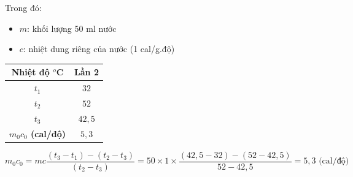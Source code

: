 \documentclass[12pt,a4paper]{report}
\begin{document}
Trong đó:
\begin{itemize}
    \item \( m \): khối lượng 50 ml nước
    \item \( c \): nhiệt dung riêng của nước (1 cal/g.độ)
\end{itemize}   
\begin{table}[h!]
    \centering
    \begin{tabular}{|c|c|}
    \hline
    \textbf{Nhiệt độ $^o$C}    & \textbf{Lần 2} \\ \hline
    \textbf{$t_1$}             & $32$           \\ \hline
    \textbf{$t_2$}             & $52$           \\ \hline
    \textbf{$t_3$}             & $42,5$         \\ \hline
    \textbf{$m_0c_0$ (cal/độ)} & $5,3$          \\ \hline
    \end{tabular}
\end{table}
\[
    m_0c_0 = mc\frac{(t_3 - t_1) - (t_2 - t_3)}{(t_2 - t_3)} = 50\times1\times \frac{(42,5 -32)-(52-42,5)}{52-42,5}= 5,3 \text{ (cal/độ)}
\]
\end{document}
